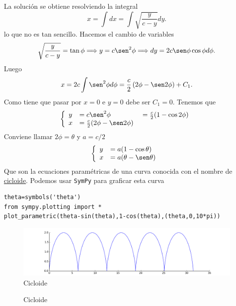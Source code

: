 La solución se obtiene resolviendo la integral
\[x=\int dx=\int \sqrt{\frac{y}{c-y}}dy.\]
lo que no es tan sencillo. Hacemos el cambio de variables
\[\sqrt{\frac{y}{c-y}}=\tan\phi\Longrightarrow y=c\sen^2\phi\Longrightarrow dy=2c\sen\phi\cos\phi d\phi.\]
Luego
\[x=2c\int\sen^2\phi d\phi=\frac{c}{2}\left(2\phi-\sen 2\phi\right)+C_1.\]
Como tiene que pasar por $x=0$ e $y=0$ debe ser $C_1=0$.  Tenemos que
 \[\left\{\begin{array}{l l l}
	      y&=c\sen^2 \phi&=\frac{c}{2}(1-\cos2\phi)\\
	      x&=\frac{c}{2}(2\phi-\sen2\phi)\ &\\
          \end{array}\right.
\]
Conviene llamar $2\phi=\theta$ y $a=c/2$
 \[\left\{\begin{array}{l l }
	      y&= a(1-\cos\theta)\\
	      x&=a(\theta-\sen\theta)\
          \end{array}\right.
\]
Que son la ecuaciones paramétricas de una curva conocida con el nombre de \href{http://es.wikipedia.org/wiki/Cicloide}{cicloide}\link. Podemos usar \texttt{SymPy} para graficar esta curva
\begin{lstlisting}
theta=symbols('theta')
from sympy.plotting import *
plot_parametric(theta-sin(theta),1-cos(theta),(theta,0,10*pi))
\end{lstlisting}
\begin{figure}[h]
\begin{center}
\includegraphics[scale=.3]{imagenes/cicloide.png}
\end{center}\caption{Cicloide}\label{fig:cicloide}
\end{figure}


\begin{figure}[h]
\begin{center}
\end{center}\caption{Cicloide}\label{fig:cicloide}
\end{figure}


